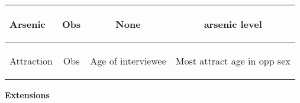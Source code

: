 \begin{enumerate}
\begin{tabular}{|l|c|c|c|}
Arsenic &
\begin{key}
  Obs
\end{key}
&
\begin{key}
 None
\end{key}
&
\begin{key}
  arsenic level 
\end{key}
\\ \hline
Attraction &
\begin{key}
  Obs
\end{key}
&
\begin{key}
 Age of interviewee
\end{key}
&
\begin{key}
 Most attract age in opp sex
\end{key}
\\ \hline
 \end{tabular}


 \begin{center}
{\bf Extensions }   
 \end{center}



\end{enumerate}
